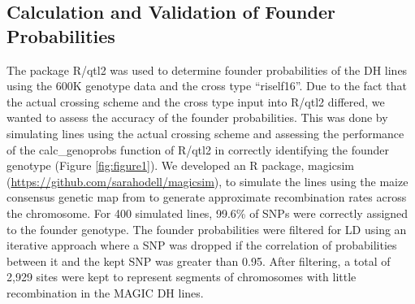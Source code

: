 \documentclass[article,9pt,twocolumn,twoside]{rilabRxiv}
\begin{document}
\subsection{Calculation and Validation of Founder Probabilities}
The package R/qtl2 \citep{RN2} was used to determine founder probabilities of
the DH lines using the 600K genotype data and the cross type ``riself16''. Due
to the fact that the actual crossing scheme and the cross type input into R/qtl2
differed, we wanted to assess the accuracy of the founder probabilities. This
was done by simulating lines using the actual crossing scheme and assessing the
 performance of the calc\_genoprobs function of R/qtl2 in correctly identifying
the founder genotype (Figure \ref{fig:figure1}). We developed an R package,
magicsim (\url{https://github.com/sarahodell/magicsim}), to simulate the lines
using the maize consensus genetic map from \citep{ogut2015joint} to generate
approximate recombination rates across the chromosome. For 400 simulated lines,
 99.6\% of SNPs were correctly assigned to the founder genotype.
 The founder probabilities were filtered for LD using an iterative approach where
 a SNP was dropped if the correlation of probabilities between it and the kept SNP
 was greater than 0.95. After filtering, a total of 2,929 sites were kept to represent
 segments of chromosomes with little recombination in the MAGIC DH lines.
\end{document}

